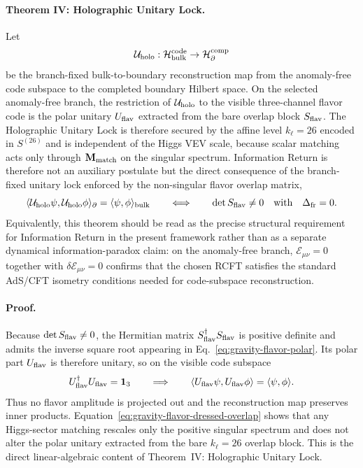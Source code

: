 \documentclass[11pt]{article}
\begin{document}
\paragraph{Theorem IV: Holographic Unitary Lock.}
Let
\begin{equation}
\label{eq:gravity-information-return-map}
 \mathcal U_{\rm holo}:\mathcal H_{\rm bulk}^{\rm code}\to\mathcal H_{\partial}^{\rm comp}
\end{equation}
be the branch-fixed bulk-to-boundary reconstruction map from the anomaly-free
code subspace to the completed boundary Hilbert space. On the selected anomaly-free branch, the restriction of $\mathcal U_{\rm holo}$ to the visible three-channel flavor code is the polar unitary $U_{\rm flav}$ extracted from the bare overlap block $S_{\rm flav}$. The Holographic Unitary Lock is therefore secured by the affine level $k_{\ell}=26$ encoded in $S^{(26)}$ and is independent of the Higgs VEV scale, because scalar matching acts only through $\mathbf M_{\rm match}$ on the singular spectrum. Information Return is therefore not an auxiliary postulate but the direct consequence of the branch-fixed unitary lock enforced by the non-singular flavor overlap matrix,
\begin{equation}
\label{eq:gravity-information-return-isometry}
 \langle \mathcal U_{\rm holo}\psi,\mathcal U_{\rm holo}\phi\rangle_{\partial}
 =
 \langle \psi,\phi\rangle_{\rm bulk}
 \qquad\Longleftrightarrow\qquad
 \det S_{\rm flav}\neq0
 \quad
 \text{with}\quad
 \Delta_{\rm fr}=0.
\end{equation}
Equivalently, this theorem should be read as the precise structural requirement for Information
Return in the present framework rather than as a separate dynamical
information-paradox claim: on the anomaly-free branch,
$\mathcal E_{\mu\nu}=0$ together with $\delta\mathcal E_{\mu\nu}=0$ confirms
that the chosen RCFT satisfies the standard AdS/CFT isometry conditions needed
for code-subspace reconstruction.

\paragraph{Proof.}
Because $\det S_{\rm flav}\neq0$, the Hermitian matrix
$S_{\rm flav}^{\dagger}S_{\rm flav}$ is positive definite and admits the
inverse square root appearing in Eq.~\eqref{eq:gravity-flavor-polar}. Its
polar part $U_{\rm flav}$ is therefore unitary, so on the visible code subspace
\begin{equation}
 U_{\rm flav}^{\dagger}U_{\rm flav}=\mathbf 1_3
 \qquad\Longrightarrow\qquad
 \langle U_{\rm flav}\psi,U_{\rm flav}\phi\rangle
 =
 \langle \psi,\phi\rangle.
\end{equation}
Thus no flavor amplitude is projected out and the reconstruction map preserves
inner products. Equation~\eqref{eq:gravity-flavor-dressed-overlap} shows that
any Higgs-sector matching rescales only the positive singular spectrum and does
not alter the polar unitary extracted from the bare $k_{\ell}=26$ overlap
block. This is the direct linear-algebraic content of Theorem~IV: Holographic
Unitary Lock.
\end{document}
